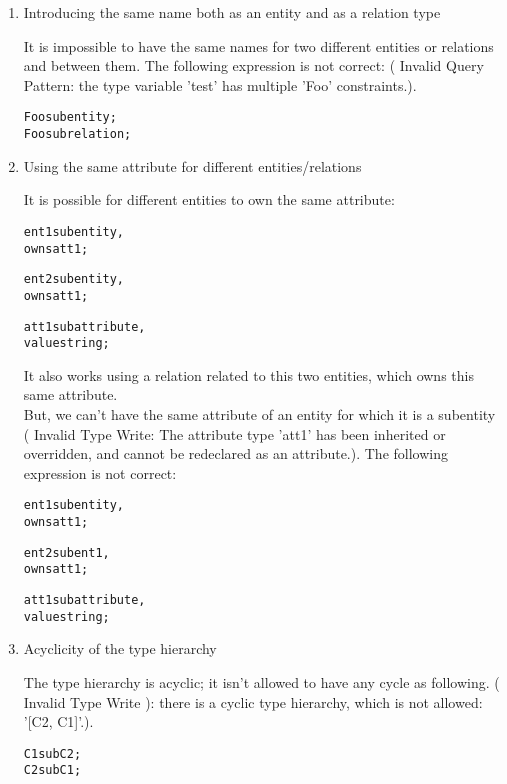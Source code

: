 \documentclass{article}
\begin{document}
\begin{enumerate}

\item Introducing the same name both as an entity and as a relation type

It is impossible to have the same names for two different entities or relations and between them.
The following expression is not correct: ( Invalid Query Pattern: the type variable 'test' has multiple 'Foo' constraints.).

  \begin{alltt}
    Foo sub entity;
    Foo sub relation;
  \end{alltt}


\item Using the same attribute for different entities/relations

It is possible for different entities to own the same attribute:

  \begin{alltt}
     ent1 sub entity,
       owns att1;
     	
     ent2 sub entity,
       owns att1;
    		
    	 att1 sub attribute,
       value string;
  \end{alltt}
  
It also works using a relation related to this two entities, which owns this same attribute. \\
But, we can't have the same attribute of an entity for which it is a subentity ( Invalid Type Write: The attribute type 'att1' has been inherited or overridden, and cannot be redeclared as an attribute.). The following expression is not correct:

\begin{alltt}
     ent1 sub entity,
       owns att1;
     	
     ent2 sub ent1,
       owns att1;
    		
    	 att1 sub attribute,
       value string;
  \end{alltt}
	
\item Acyclicity of the type hierarchy

The type hierarchy is acyclic; it isn't allowed to have any cycle as following. ( Invalid Type Write ): there is a cyclic type hierarchy, which is not allowed: '[C2, C1]'.).

  \begin{alltt}
    C1 sub C2;
    C2 sub C1;
  \end{alltt}



\end{enumerate}
\end{document}
